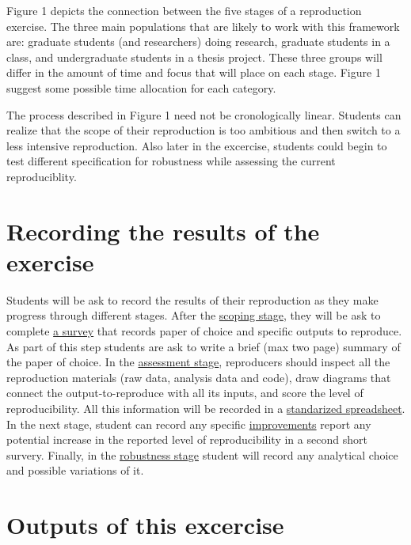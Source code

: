 \documentclass[]{book}
\begin{document}
Figure 1 depicts the connection between the five stages of a reproduction exercise.
The three main populations that are likely to work with this framework are: graduate students (and researchers) doing research,
graduate students in a class, and undergraduate students in a thesis project. These three groups will
differ in the amount of time and focus that will place on each stage. Figure 1
suggest some possible time allocation for each category.

The process described in Figure 1 need not be cronologically linear. Students can realize that the scope of their reproduction is too ambitious and then switch to a less intensive reproduction. Also later in the excercise, students could begin to test different specification for robustness while assessing the current reproduciblity.

\hypertarget{recording-the-results-of-the-exercise}{%
\section{Recording the results of the exercise}\label{recording-the-results-of-the-exercise}}

Students will be ask to record the results of their reproduction as they make progress through different stages. After the \protect\hyperlink{scoping}{scoping stage}, they will be ask to complete \href{https://berkeley.qualtrics.com/jfe/form/SV_8hLHNI6LGSYchEN}{a survey} that records paper of choice and specific outputs to reproduce. As part of this step students are ask to write a brief (max two page) summary of the paper of choice. In the \protect\hyperlink{assessment}{assessment stage}, reproducers should inspect all the reproduction materials (raw data, analysis data and code), draw diagrams that connect the output-to-reproduce with all its inputs, and score the level of reproducibility. All this information will be recorded in a \href{ADD\%20LINK}{standarized spreadsheet}. In the next stage, student can record any specific \protect\hyperlink{improvements}{improvements} report any potential increase in the reported level of reproducibility in a second short survery. Finally, in the \protect\hyperlink{robust}{robustness stage} student will record any analytical choice and possible variations of it.

\hypertarget{outputs-of-this-excercise}{%
\section{Outputs of this excercise}\label{outputs-of-this-excercise}}
\end{document}
